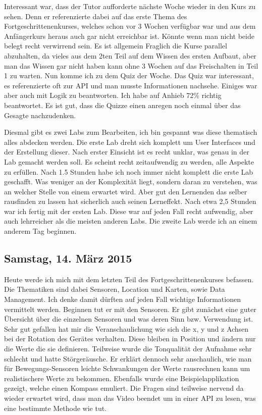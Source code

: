 \documentclass[12pt,a4paper,bibliography=totocnumbered,listof=totocnumbered]{scrartcl}
\begin{document}
Interessant war, dass der Tutor aufforderte nächste Woche wieder in den Kurs zu sehen. Denn er referenzierte dabei auf das erste Thema des Fortgeschrittenenkurses, welches schon vor 3 Wochen verfügbar war und aus dem Anfängerkurs heraus auch gar nicht erreichbar ist. Könnte wenn man nicht beide belegt recht verwirrend sein. Es ist allgemein Fraglich die Kurse parallel abzuhalten, da vieles aus dem 2ten Teil auf dem Wissen des ersten Aufbaut, aber man das Wissen gar nicht haben kann ohne 3 Wochen auf das Freischalten in Teil 1 zu warten. 
Nun komme ich zu dem Quiz der Woche. 
Das Quiz war interessant, es referenzierte oft zur API und man musste Informationen nachsehe. Einiges war aber auch mit Logik zu beantworten. Ich habe auf Anhieb 72\% richtig beantwortet. Es ist gut, dass die Quizze einen anregen noch einmal über das Gesagte nachzudenken. 

Diesmal gibt es zwei Labs zum Bearbeiten, ich bin gespannt was diese thematisch alles abdecken werden. 
Die erste Lab dreht sich komplett um User Interfaces und der Erstellung dieser. Nach erster Einsicht ist es recht unklar, was genau in der Lab gemacht werden soll. Es scheint recht zeitaufwendig zu werden, alle Aspekte zu erfüllen. Nach 1.5 Stunden habe ich noch immer nicht komplett die erste Lab geschafft. Was weniger an der Komplexität liegt, sondern daran zu verstehen, was an welcher Stelle von einem erwartet wird. Aber gut den Lernenden das selber rausfinden zu lassen hat sicherlich auch seinen Lerneffekt. Nach etwa 2,5 Stunden war ich fertig mit der ersten Lab. Diese war auf jeden Fall recht aufwendig, aber auch lehrreicher als die meisten anderen Labs. 
Die zweite Lab werde ich an einem anderem Tag beginnen. 

\subsection{Samstag, 14. März 2015}

Heute werde ich mich mit dem letzten Teil des Fortgeschrittenenkurses befassen. 
Die Thematiken sind dabei Sensoren, Location und Karten, sowie Data Management. Ich denke damit dürften auf jeden Fall wichtige Informationen vermittelt werden. Beginnen tut er mit den Sensoren. Er gibt zunächst eine guter Übersicht über die einzelnen Sensoren und was deren Sinn bzw. Verwendung ist. Sehr gut gefallen hat mir die Veranschaulichung wie sich die x, y und z Achsen bei der Rotation des Gerätes verhalten. Diese bleiben in Position und ändern nur die Werte die sie definieren. Teilweise wurde die Tonqualität der Aufnahme sehr schlecht und hatte Störgeräusche. Er erklärt dennoch sehr anschaulich, wie man für Bewegungs-Sensoren leichte Schwankungen der Werte rausrechnen kann um realistischere Werte zu bekommen. Ebenfalls wurde eine Beispielapplikation gezeigt, welche einen Kompass emuliert. Die Fragen sind teilweise nervend da wieder erwartet wird, dass man das Video beendet um in einer API zu lesen, was eine bestimmte Methode wie tut. 
\end{document}
